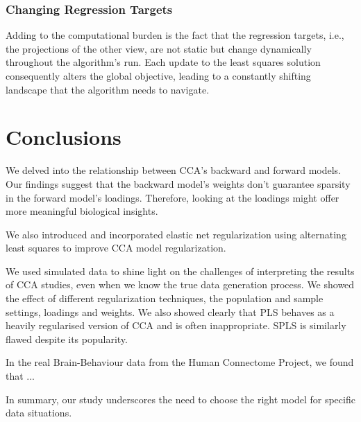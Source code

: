 \subsubsection{Changing Regression Targets}\label{subsec:changing-regression-targets}
Adding to the computational burden is the fact that the regression targets, i.e., the projections of the other view, are not static but change dynamically throughout the algorithm's run.
Each update to the least squares solution consequently alters the global objective, leading to a constantly shifting landscape that the algorithm needs to navigate.

\section{Conclusions}

We delved into the relationship between CCA's backward and forward models.
Our findings suggest that the backward model's weights don't guarantee sparsity in the forward model's loadings.
Therefore, looking at the loadings might offer more meaningful biological insights.

We also introduced and incorporated elastic net regularization using alternating least squares to improve CCA model regularization.

We used simulated data to shine light on the challenges of interpreting the results of CCA studies, even when we know the true data generation process.
We showed the effect of different regularization techniques, the population and sample settings, loadings and weights.
We also showed clearly that PLS behaves as a heavily regularised version of CCA and is often inappropriate.
SPLS is similarly flawed despite its popularity.

In the real Brain-Behaviour data from the Human Connectome Project, we found that ...

In summary, our study underscores the need to choose the right model for specific data situations.



